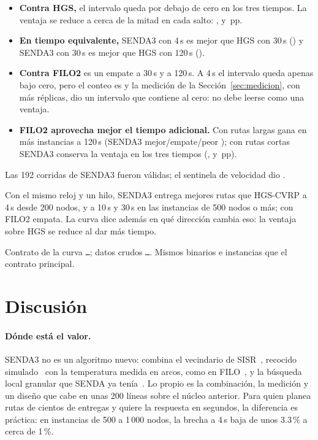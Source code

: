 \documentclass[11pt,a4paper]{article}
\newcommand{\senda}{SENDA}
\newcommand{\sendatres}{SENDA3}
\newcommand{\pp}{\,pp}
\newcommand{\tsl}[1]{\texttt{\small #1}}
\begin{document}
\begin{itemize}[leftmargin=1.5em]
\item \textbf{Contra HGS,} el intervalo queda por debajo de cero en los tres tiempos. La ventaja se
reduce a cerca de la mitad en cada salto: \DCurHgsIVMedia, \DCurHgsXXXMedia{} y \DCurHgsCXXMedia\pp.
\item \textbf{En tiempo equivalente,} \sendatres{} con 4\,s es mejor que HGS con 30\,s
(\DCruceIVHgsXXX) y \sendatres{} con 30\,s es mejor que HGS con 120\,s (\DCruceXXXHgsCXX).
\item \textbf{Contra FILO2} es un empate a 30\,s y a 120\,s. A 4\,s el intervalo queda apenas bajo
cero, pero el conteo es \DCurFiloIVCuenta{} y la medición de la Sección~\ref{sec:medicion}, con más
réplicas, dio un intervalo que contiene al cero: no debe leerse como una ventaja.
\item \textbf{FILO2 aprovecha mejor el tiempo adicional.} Con rutas largas gana en más instancias a
120\,s (\sendatres{} mejor/empate/peor \DCurFiloLargasCXXCuenta); con rutas cortas \sendatres{}
conserva la ventaja en los tres tiempos (\DCurFiloCortasIVMedia, \DCurFiloCortasXXXMedia{} y
\DCurFiloCortasCXXMedia\pp).
\end{itemize}

Las 192 corridas de \sendatres{} fueron válidas; el sentinela de velocidad dio \SentinelaTres.

\begin{ideaclave}
Con el mismo reloj y un hilo, \sendatres{} entrega mejores rutas que HGS-CVRP a 4\,s desde 200 nodos,
y a 10\,s y 30\,s en las instancias de 500 nodos o más; con FILO2 empata. La curva dice además en qué dirección cambia eso: la
ventaja sobre HGS se reduce al dar más tiempo.
\end{ideaclave}

\begin{reproducir}
Contrato de la curva \tsl{\HashCurva\ldots}; datos crudos \tsl{\HashRawCurva\ldots}. Mismos binarios e
instancias que el contrato principal.
\end{reproducir}

\section{Discusión}
\label{sec:discusion}

\paragraph{Dónde está el valor.} \sendatres{} no es un algoritmo nuevo: combina el vecindario de
SISR~\cite{christiaens2020}, recocido simulado~\cite{kirkpatrick1983} con la temperatura medida en arcos, como en
FILO~\cite{accorsi2021}, y la búsqueda local granular que
\senda{} ya tenía~\cite{toth2003granular}. Lo propio es la combinación, la medición y un diseño que
cabe en unas 200 líneas sobre el núcleo anterior. Para quien planea rutas de cientos de entregas y
quiere la respuesta en segundos, la diferencia es práctica: en instancias de 500 a 1\,000 nodos, la
brecha a 4\,s baja de unos 3.3\,\% a cerca de 1\,\%.
\end{document}
